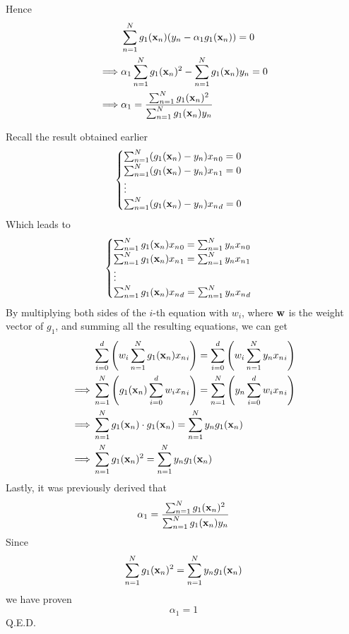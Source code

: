 \documentclass[11pt]{article}
\theoremstyle{definition}
\begin{document}
Hence
\begin{align*}
  &\sum^N_{n = 1}g_1(\vb{x}_n)(y_n - \alpha_1g_1(\vb{x}_n)) = 0 \\ 
  \implies & \alpha_1\sum^N_{n = 1}g_1(\vb{x}_n)^2 - \sum^N_{n = 1}g_1(\vb{x}_n)y_n = 0 \\ 
  \implies & \alpha_1 = \frac{\sum^N_{n = 1}g_1(\vb{x}_n)^2}{\sum^N_{n = 1}g_1(\vb{x}_n)y_n}
\end{align*}
\par
Recall the result obtained earlier 
\begin{align*}
  \begin{cases}
    \sum^N_{n = 1}(g_1(\vb{x}_n) - y_n){x_n}_0 = 0 \\
    \sum^N_{n = 1}(g_1(\vb{x}_n) - y_n){x_n}_1 = 0 \\
    \vdots \\
    \sum^N_{n = 1}(g_1(\vb{x}_n) - y_n){x_n}_d = 0 \\
  \end{cases}
\end{align*}
Which leads to 
\begin{align*}
  \begin{cases}
    \sum^N_{n = 1}g_1(\vb{x}_n){x_n}_0 = \sum^N_{n = 1}y_n{x_n}_0 \\
    \sum^N_{n = 1}g_1(\vb{x}_n){x_n}_1 = \sum^N_{n = 1}y_n{x_n}_1 \\
    \vdots \\
    \sum^N_{n = 1}g_1(\vb{x}_n){x_n}_d = \sum^N_{n = 1}y_n{x_n}_d \\
  \end{cases}
\end{align*}
\newpage
By multiplying both sides of the $i$-th equation with $w_i$, where $\vb{w}$ is the weight vector of $g_1$, and summing all the resulting equations, we can get
\begin{align*}
  &\sum^d_{i = 0}\left(w_i\sum^N_{n = 1}g_1(\vb{x}_n){x_n}_i\right) = \sum^d_{i = 0}\left(w_i\sum^N_{n = 1}y_n{x_n}_i\right) \\ 
  \implies &\sum^N_{n = 1}\left(g_1(\vb{x}_n)\sum^d_{i = 0}w_i{x_n}_i\right) = \sum^N_{n = 1}\left(y_n\sum^d_{i = 0}w_i{x_n}_i\right) \\ 
  \implies &\sum^N_{n = 1}g_1(\vb{x}_n)\cdot g_1(\vb{x}_n) = \sum^N_{n = 1}y_ng_1(\vb{x}_n) \\ 
  \implies &\sum^N_{n = 1}g_1(\vb{x}_n)^2 = \sum^N_{n = 1}y_ng_1(\vb{x}_n) \\ 
\end{align*}
Lastly, it was previously derived that
\[
  \alpha_1 = \frac{\sum^N_{n = 1}g_1(\vb{x}_n)^2}{\sum^N_{n = 1}g_1(\vb{x}_n)y_n}
\]
Since 
\[
  \sum^N_{n = 1}g_1(\vb{x}_n)^2 = \sum^N_{n = 1}y_ng_1(\vb{x}_n)  
\]
we have proven 
\[
  \alpha_1 = 1
\]
Q.E.D.
\newpage
\end{document}
